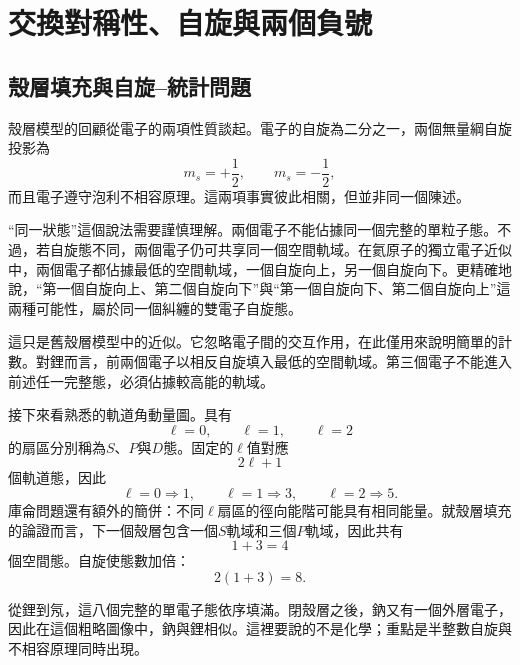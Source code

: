 \chapter{交換對稱性、自旋與兩個負號}

\section{殼層填充與自旋--統計問題}

殼層模型的回顧從電子的兩項性質談起。電子的自旋為二分之一，兩個無量綱自旋投影為
\begin{equation}
m_s=+\frac12,
\qquad
m_s=-\frac12,
\end{equation}
而且電子遵守泡利不相容原理。這兩項事實彼此相關，但並非同一個陳述。

``同一狀態''這個說法需要謹慎理解。兩個電子不能佔據同一個完整的單粒子態。不過，若自旋態不同，兩個電子仍可共享同一個空間軌域。在氦原子的獨立電子近似中，兩個電子都佔據最低的空間軌域，一個自旋向上，另一個自旋向下。更精確地說，``第一個自旋向上、第二個自旋向下''與``第一個自旋向下、第二個自旋向上''這兩種可能性，屬於同一個糾纏的雙電子自旋態。

這只是舊殼層模型中的近似。它忽略電子間的交互作用，在此僅用來說明簡單的計數。對鋰而言，前兩個電子以相反自旋填入最低的空間軌域。第三個電子不能進入前述任一完整態，必須佔據較高能的軌域。

接下來看熟悉的軌道角動量圖。具有
\begin{equation}
\ell=0,\qquad \ell=1,\qquad \ell=2
\end{equation}
的扇區分別稱為\(S\)、\(P\)與\(D\)態。固定的\(\ell\)值對應
\begin{equation}
2\ell+1
\end{equation}
個軌道態，因此
\begin{equation}
\ell=0\Rightarrow 1,
\qquad
\ell=1\Rightarrow 3,
\qquad
\ell=2\Rightarrow 5.
\end{equation}
庫侖問題還有額外的簡併：不同\(\ell\)扇區的徑向能階可能具有相同能量。就殼層填充的論證而言，下一個殼層包含一個\(S\)軌域和三個\(P\)軌域，因此共有
\begin{equation}
1+3=4
\end{equation}
個空間態。自旋使態數加倍：
\begin{equation}
2(1+3)=8.
\end{equation}

從鋰到氖，這八個完整的單電子態依序填滿。閉殼層之後，鈉又有一個外層電子，因此在這個粗略圖像中，鈉與鋰相似。這裡要說的不是化學；重點是半整數自旋與不相容原理同時出現。


